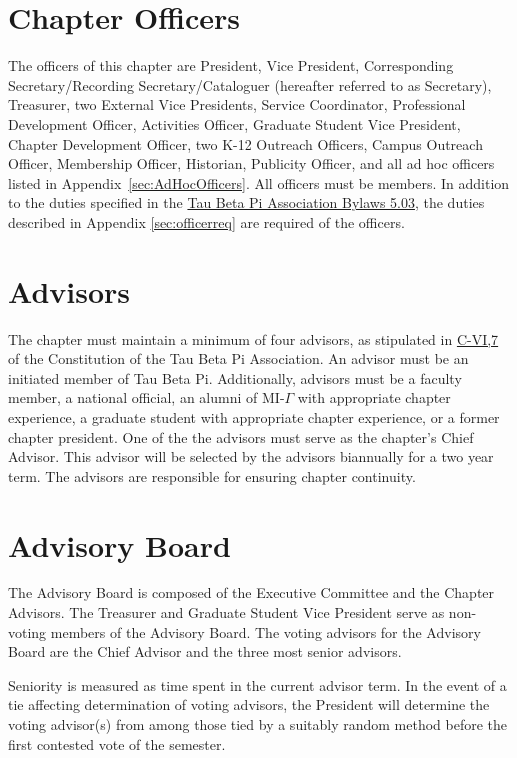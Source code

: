 \section{Chapter Officers} The officers of this chapter are  President, Vice President, Corresponding Secretary/Recording Secretary/Cataloguer 
(hereafter referred to as Secretary), Treasurer, two External Vice Presidents,
 Service Coordinator, Professional Development Officer, Activities Officer,  Graduate Student Vice President, Chapter Development Officer, two K-12 Outreach
 Officers, Campus Outreach Officer, Membership Officer, 
Historian, Publicity Officer, and all ad hoc officers listed in Appendix~\ref{sec:AdHocOfficers}.  All officers must be  members. In addition to the duties specified in the \href{http://www.tbp.org/off/ConstBylaw.pdf}{Tau Beta Pi Association Bylaws 5.03}, the duties described in Appendix \ref{sec:officerreq} are required of the officers.

\section{Advisors}\label{sec:advisors} The chapter must maintain a minimum of four advisors, as stipulated in \href{http://www.tbp.org/off/ConstBylaw.pdf}{C-VI,7} of the Constitution of the Tau Beta Pi Association. An advisor must be an initiated member of Tau Beta Pi. Additionally, advisors must be a faculty member, %
a national official, %
an alumni of MI-$\Gamma$ with appropriate chapter experience, a graduate student with appropriate chapter experience, or a former chapter president. One of the the advisors must serve as the chapter's Chief Advisor. This advisor will be selected by the advisors biannually for a two year term. The advisors are responsible for ensuring chapter continuity.

\section{Advisory Board}\label{sec:advbrd} The Advisory Board is composed of the Executive Committee and the Chapter Advisors.  The Treasurer and Graduate Student Vice President serve as non-voting members of the Advisory Board. The voting advisors for the Advisory Board are the Chief Advisor and the three most senior advisors.
\begin{enumsubsection}
\itemnotoc Seniority is measured as time spent in the current advisor term.
\itemnotoc In the event of a tie affecting determination of voting advisors, the President will determine the voting advisor(s) from among those tied by a suitably random method before the first contested vote of the semester.
\end{enumsubsection}

